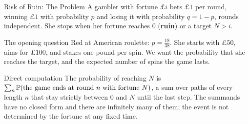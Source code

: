 \begin{frame}{Risk of Ruin: The Problem}
  \label{fr:ruinprob}
  \small
  A gambler with fortune $\pounds i$ bets $\pounds1$ per round, winning $\pounds1$ with probability $p$ and losing it with probability $q=1-p$, rounds independent. She stops when her fortune reaches $0$ (\textbf{ruin}) or a target $N>i$.
  \begin{exampleblock}{The opening question}
    Red at American roulette: $p=\tfrac{18}{38}$. She starts with $\pounds50$, aims for $\pounds100$, and stakes one pound per spin. We want the probability that she reaches the target, and the expected number of spins the game lasts.
  \end{exampleblock}
  \begin{block}{Direct computation}
    The probability of reaching $N$ is $\sum_n\mathbb{P}(\text{the game ends at round $n$ with fortune $N$})$, a sum over paths of every length $n$ that stay strictly between $0$ and $N$ until the last step. The summands have no closed form and there are infinitely many of them; the event is not determined by the fortune at any fixed time.
  \end{block}
\end{frame}

